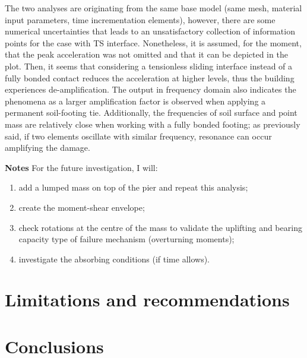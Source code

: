 The two analyses are originating from the same base model (same mesh, material input parameters, time incrementation elements), however, there are some numerical uncertainties that leads to an unsatisfactory collection of information points for the case with TS interface. Nonetheless, it is assumed, for the moment, that the peak acceleration was not omitted and that it can be depicted in the plot. Then, it seems that considering a tensionless sliding interface instead of a fully bonded contact reduces the acceleration at higher levels, thus the building experiences de-amplification. The output in frequency domain also indicates the phenomena as a larger amplification factor is observed when applying a permanent soil-footing tie. Additionally, the frequencies of soil surface and point mass are relatively close when working with a fully bonded footing; as previously said, if two elements oscillate with similar frequency, resonance can occur amplifying the damage. 


\textbf{Notes}
For the future investigation, I will:
\begin{enumerate}
	\item add a lumped mass on top of the pier and repeat this analysis;
	\item create the moment-shear envelope;
	\item check rotations at the centre of the mass to validate the uplifting and bearing capacity type of failure mechanism (overturning moments);
	\item investigate the absorbing conditions (if time allows).
\end{enumerate}
\section{Limitations and recommendations}


\section{Conclusions}

